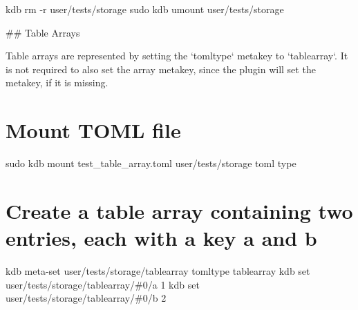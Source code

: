 kdb rm -\/r user/tests/storage sudo kdb umount user/tests/storage 
\begin{DoxyCode}
## Table Arrays

Table arrays are represented by setting the `tomltype` metakey to `tablearray`. It is not required to also
       set the array metakey, since the plugin will set the metakey, if it is missing.
\end{DoxyCode}
 \hypertarget{autotoc_md693_autotoc_md764}{}\section{Mount T\+O\+M\+L file}\label{autotoc_md693_autotoc_md764}
sudo kdb mount test\+\_\+table\+\_\+array.\+toml user/tests/storage toml type\hypertarget{autotoc_md693_autotoc_md765}{}\section{Create a table array containing two entries, each with a key \textquotesingle{}a\textquotesingle{} and \textquotesingle{}b\textquotesingle{}}\label{autotoc_md693_autotoc_md765}
kdb meta-\/set \textquotesingle{}user/tests/storage/tablearray\textquotesingle{} \textquotesingle{}tomltype\textquotesingle{} \textquotesingle{}tablearray\textquotesingle{} kdb set \textquotesingle{}user/tests/storage/tablearray/\#0/a\textquotesingle{} \textquotesingle{}1\textquotesingle{} kdb set \textquotesingle{}user/tests/storage/tablearray/\#0/b\textquotesingle{} \textquotesingle{}2\textquotesingle{}

